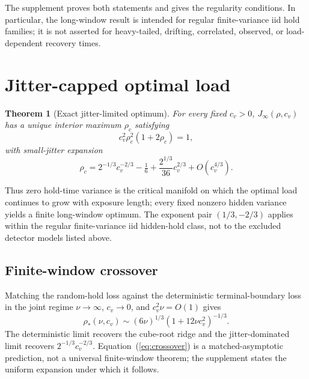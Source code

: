 \documentclass[10pt,twocolumn]{article}
\newtheorem{theorem}{Theorem}
\begin{document}
The supplement proves both statements and gives the regularity conditions. In
particular, the long-window result is intended for regular finite-variance iid
hold families; it is not asserted for heavy-tailed, drifting, correlated,
observed, or load-dependent recovery times.

\section{Jitter-capped optimal load}
\label{sec:optimal-load}
\begin{theorem}[Exact jitter-limited optimum]
\label{thm:cubic}
For every fixed $c_v>0$, $J_\infty(\rho,c_v)$ has a unique interior maximum
$\rho_c$ satisfying
\begin{equation}
 c_v^2\rho_c^2(1+2\rho_c)=1,
 \label{eq:cubic}
\end{equation}
with small-jitter expansion
\begin{equation}
 \rho_c=2^{-1/3}c_v^{-2/3}-\tfrac16
 +\frac{2^{1/3}}{36}c_v^{2/3}+O(c_v^{4/3}).
 \label{eq:smallc}
\end{equation}
\end{theorem}

Thus zero hold-time variance is the critical manifold on which the optimal
load continues to grow with exposure length; every fixed nonzero hidden
variance yields a finite long-window optimum. The exponent pair
$(1/3,-2/3)$ applies within the regular finite-variance iid hidden-hold class,
not to the excluded detector models listed above.

\subsection{Finite-window crossover}
Matching the random-hold loss against the deterministic terminal-boundary loss
in the joint regime $\nu\to\infty$, $c_v\to0$, and
$c_v^2\nu=O(1)$ gives
\begin{equation}
 \rho_*(\nu,c_v)\sim
 (6\nu)^{1/3}(1+12\nu c_v^2)^{-1/3}.
 \label{eq:crossover}
\end{equation}
The deterministic limit recovers the cube-root ridge and the jitter-dominated
limit recovers $2^{-1/3}c_v^{-2/3}$. Equation~(\ref{eq:crossover}) is a
matched-asymptotic prediction, not a universal finite-window theorem; the
supplement states the uniform expansion under which it follows.
\end{document}
